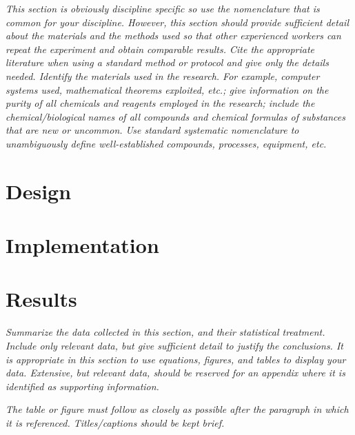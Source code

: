 \documentclass[11pt,a4paper,oneside]{report}
\newcommand{\instructions}[1]{{\color{orange}\itshape #1}}
\begin{document}
\instructions{This section is obviously discipline specific so use the
nomenclature that is common for your discipline. However, this section
should provide sufficient detail about the materials and the methods
used so that other experienced workers can repeat the experiment and
obtain comparable results. Cite the appropriate literature when using a
standard method or protocol and give only the details needed. Identify
the materials used in the research. For example, computer systems used,
mathematical theorems exploited, etc.; give information on the purity of
all chemicals and reagents employed in the research; include the
chemical/biological names of all compounds and chemical formulas of
substances that are new or uncommon. Use standard systematic
nomenclature to unambiguously define well-established compounds,
processes, equipment, etc.}




\chapter{Design}
\label{design}




\chapter{Implementation}
\label{implementation}




\chapter{Results}
\label{results}

\instructions{Summarize the data collected in this section, and their
statistical treatment. Include only relevant data, but give sufficient
detail to justify the conclusions. It is appropriate in this section to
use equations, figures, and tables to display your data. Extensive, but
relevant data, should be reserved for an appendix where it is identified
as supporting information.}

\instructions{The table or figure must follow as closely as possible after the
paragraph in which it is referenced. Titles/captions should be kept
brief.}
\end{document}

